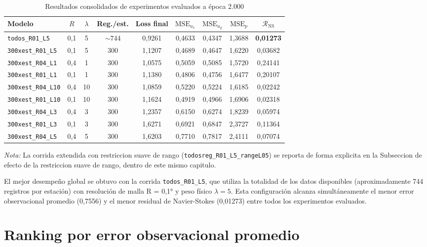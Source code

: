 \begin{table}[H]
\centering
\caption{Resultados consolidados de experimentos evaluados a época 2.000}
\label{tab:maestra_resultados}
\begin{tabular}{lcccccccc}
\hline
Modelo & $R$ & $\lambda$ & Reg./est. & Loss final & $\text{MSE}_{u_x}$ & $\text{MSE}_{u_y}$ & $\text{MSE}_{p}$ & $\mathcal{R}_{\text{NS}}$ \\
\hline
\texttt{todos\_R01\_L5} & 0,1 & 5 & $\sim744$ & 0,9261 & 0,4633 & 0,4347 & 1,3688 & \textbf{0,01273} \\
\texttt{300xest\_R01\_L5} & 0,1 & 5 & 300 & 1,1207 & 0,4689 & 0,4647 & 1,6220 & 0,03682 \\
\texttt{300xest\_R04\_L1} & 0,4 & 1 & 300 & 1,0575 & 0,5059 & 0,5085 & 1,5720 & 0,24141 \\
\texttt{300xest\_R01\_L1} & 0,1 & 1 & 300 & 1,1380 & 0,4806 & 0,4756 & 1,6477 & 0,20107 \\
\texttt{300xest\_R04\_L10} & 0,4 & 10 & 300 & 1,0859 & 0,5220 & 0,5224 & 1,6185 & 0,02242 \\
\texttt{300xest\_R01\_L10} & 0,1 & 10 & 300 & 1,1624 & 0,4919 & 0,4966 & 1,6906 & 0,02318 \\
\texttt{300xest\_R04\_L3} & 0,4 & 3 & 300 & 1,2357 & 0,6150 & 0,6274 & 1,8239 & 0,05974 \\
\texttt{300xest\_R01\_L3} & 0,1 & 3 & 300 & 1,6271 & 0,6921 & 0,6847 & 2,3727 & 0,11364 \\
\texttt{300xest\_R04\_L5} & 0,4 & 5 & 300 & 1,6203 & 0,7710 & 0,7817 & 2,4111 & 0,07074 \\
\hline
\end{tabular}
\end{table}

\noindent\textit{Nota:} La corrida extendida con restriccion suave de rango (\texttt{todosreg\_R01\_L5\_rangeL05}) se reporta de forma explicita en la Subseccion de efecto de la restriccion suave de rango, dentro de este mismo capitulo.

El mejor desempeño global se obtuvo con la corrida \texttt{todos\_R01\_L5}, que utiliza la totalidad de los datos disponibles (aproximadamente 744 registros por estación) con resolución de malla R = 0,1° y peso físico $\lambda = 5$. Esta configuración alcanza simultáneamente el menor error observacional promedio (0,7556) y el menor residual de Navier-Stokes (0,01273) entre todos los experimentos evaluados.

\section{Ranking por error observacional promedio}

